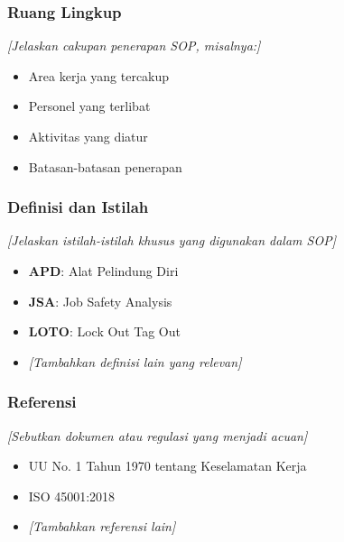 \vspace{0.5cm}

\subsubsection{Ruang Lingkup}

\textit{[Jelaskan cakupan penerapan SOP, misalnya:]}
\begin{itemize}
    \item Area kerja yang tercakup
    \item Personel yang terlibat
    \item Aktivitas yang diatur
    \item Batasan-batasan penerapan
\end{itemize}

\vspace{0.5cm}

\subsubsection{Definisi dan Istilah}

\textit{[Jelaskan istilah-istilah khusus yang digunakan dalam SOP]}

\begin{itemize}
    \item \textbf{APD}: Alat Pelindung Diri
    \item \textbf{JSA}: Job Safety Analysis
    \item \textbf{LOTO}: Lock Out Tag Out
    \item \textit{[Tambahkan definisi lain yang relevan]}
\end{itemize}

\vspace{0.5cm}

\subsubsection{Referensi}

\textit{[Sebutkan dokumen atau regulasi yang menjadi acuan]}

\begin{itemize}
    \item UU No. 1 Tahun 1970 tentang Keselamatan Kerja
    \item ISO 45001:2018
    \item \textit{[Tambahkan referensi lain]}
\end{itemize}

\vspace{1cm}


